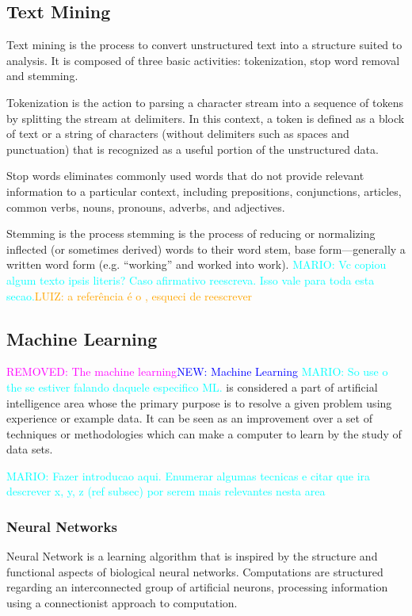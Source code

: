 \documentclass[10pt, conference]{IEEEtran}
\newcommand{\luiz}[1]{\noindent\textcolor{orange}{LUIZ: {#1}}}
\newcommand{\mario}[1]{\noindent\textcolor{cyan}{MARIO: {#1}}}
\newcommand{\rem}[1]{\noindent\textcolor{magenta}{REMOVED: {#1}}}
\newcommand{\new}[1]{\noindent\textcolor{blue}{NEW: {#1}}}
\newcommand{\luiz}[1]{}
\newcommand{\mario}[1]{}
\newcommand{\rem}[1]{}
\newcommand{\new}[1]{#1}
\begin{document}
\subsection{Text Mining}   \label{subsec:texmining}
Text mining is the process to convert unstructured text into a structure suited to analysis\cite{Feldman2007}. It is composed of three basic activities\cite{Williams2011}: tokenization, stop word removal and stemming.

Tokenization is the action to parsing a character stream into a sequence of tokens by splitting the stream at delimiters. In this context, a token is defined as a block of text or a string of characters (without delimiters such as spaces and punctuation) that is recognized as a useful portion of the unstructured data.

Stop words eliminates commonly used words that do not provide relevant information to a particular context, including prepositions, conjunctions, articles, common verbs, nouns, pronouns, adverbs, and adjectives.

Stemming is the process stemming is the process of reducing or normalizing inflected (or sometimes derived) words to their word stem, base form—generally a written word form (e.g. “working” and worked into work). \mario{Vc copiou algum texto ipsis literis? Caso afirmativo reescreva. Isso vale para toda esta secao.}\luiz{a referência é o \cite{Williams2011}, esqueci de reescrever}

\subsection{Machine Learning}   \label{subsec:ml}
\rem{The machine learning}\new{Machine Learning} \mario{So use o the se estiver falando daquele especifico ML.} is considered a part of artificial intelligence area whose the primary purpose is to resolve a given problem using experience or example data\cite{Surya2016}. It can be seen as an improvement over a set of techniques or methodologies which can make a computer to learn by the study of data sets.

\mario{Fazer introducao aqui. Enumerar algumas tecnicas e citar que ira descrever x, y, z (ref subsec) por serem mais relevantes nesta area}

\subsubsection{Neural Networks}   \label{subsubsec:nn}
Neural Network is a learning algorithm that is inspired by the structure and functional aspects of biological neural networks\cite{Russell2010}. Computations are structured regarding an interconnected group of artificial neurons, processing information using a connectionist approach to computation. 
\end{document}
